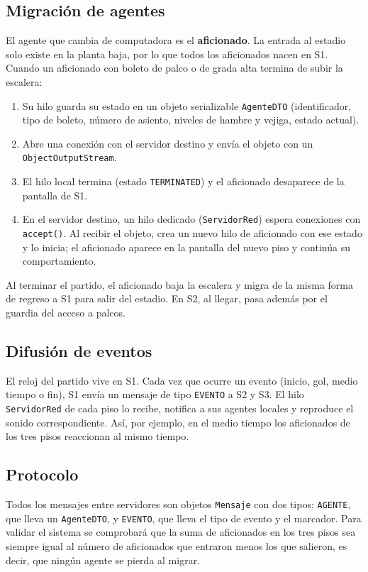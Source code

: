 \documentclass[11pt,letterpaper]{article}
\newcommand{\code}[1]{\texttt{#1}}
\begin{document}
\subsection{Migración de agentes}
El agente que cambia de computadora es el \textbf{aficionado}. La entrada al estadio solo existe en la planta baja, por lo que todos los aficionados nacen en S1. Cuando un aficionado con boleto de palco o de grada alta termina de subir la escalera:
\begin{enumerate}
  \item Su hilo guarda su estado en un objeto serializable \code{AgenteDTO} (identificador, tipo de boleto, número de asiento, niveles de hambre y vejiga, estado actual).
  \item Abre una conexión con el servidor destino y envía el objeto con un \code{ObjectOutputStream}.
  \item El hilo local termina (estado \code{TERMINATED}) y el aficionado desaparece de la pantalla de S1.
  \item En el servidor destino, un hilo dedicado (\code{ServidorRed}) espera conexiones con \code{accept()}. Al recibir el objeto, crea un nuevo hilo de aficionado con ese estado y lo inicia; el aficionado aparece en la pantalla del nuevo piso y continúa su comportamiento.
\end{enumerate}
Al terminar el partido, el aficionado baja la escalera y migra de la misma forma de regreso a S1 para salir del estadio. En S2, al llegar, pasa además por el guardia del acceso a palcos.

\subsection{Difusión de eventos}
El reloj del partido vive en S1. Cada vez que ocurre un evento (inicio, gol, medio tiempo o fin), S1 envía un mensaje de tipo \code{EVENTO} a S2 y S3. El hilo \code{ServidorRed} de cada piso lo recibe, notifica a sus agentes locales y reproduce el sonido correspondiente. Así, por ejemplo, en el medio tiempo los aficionados de los tres pisos reaccionan al mismo tiempo.

\subsection{Protocolo}
Todos los mensajes entre servidores son objetos \code{Mensaje} con dos tipos: \code{AGENTE}, que lleva un \code{AgenteDTO}, y \code{EVENTO}, que lleva el tipo de evento y el marcador. Para validar el sistema se comprobará que la suma de aficionados en los tres pisos sea siempre igual al número de aficionados que entraron menos los que salieron, es decir, que ningún agente se pierda al migrar.
\end{document}

